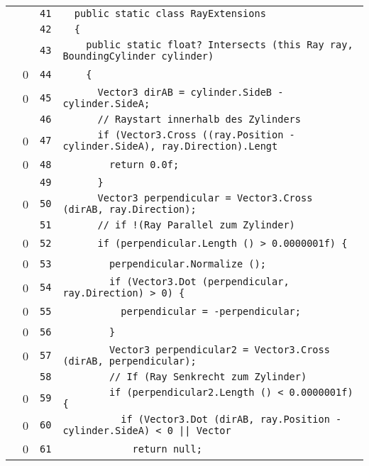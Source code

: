 \documentclass[a4paper,10pt]{article}
\begin{document}
\begin{longtable}[l]{lrrl}
\cellcolor{gray} &  & \verb~41~ & \verb~  public static class RayExtensions~\\
\cellcolor{gray} &  & \verb~42~ & \verb~  {~\\
\cellcolor{gray} &  & \verb~43~ & \verb~    public static float? Intersects (this Ray ray, BoundingCylinder cylinder)~\\
\cellcolor{red} & 0 & \verb~44~ & \verb~    {~\\
\cellcolor{red} & 0 & \verb~45~ & \verb~      Vector3 dirAB = cylinder.SideB - cylinder.SideA;~\\
\cellcolor{gray} &  & \verb~46~ & \verb~      // Raystart innerhalb des Zylinders~\\
\cellcolor{red} & 0 & \verb~47~ & \verb~      if (Vector3.Cross ((ray.Position - cylinder.SideA), ray.Direction).Lengt~\\
\cellcolor{red} & 0 & \verb~48~ & \verb~        return 0.0f;~\\
\cellcolor{gray} &  & \verb~49~ & \verb~      }~\\
\cellcolor{red} & 0 & \verb~50~ & \verb~      Vector3 perpendicular = Vector3.Cross (dirAB, ray.Direction);~\\
\cellcolor{gray} &  & \verb~51~ & \verb~      // if !(Ray Parallel zum Zylinder)~\\
\cellcolor{red} & 0 & \verb~52~ & \verb~      if (perpendicular.Length () > 0.0000001f) {~\\
\cellcolor{red} & 0 & \verb~53~ & \verb~        perpendicular.Normalize ();~\\
\cellcolor{red} & 0 & \verb~54~ & \verb~        if (Vector3.Dot (perpendicular, ray.Direction) > 0) {~\\
\cellcolor{red} & 0 & \verb~55~ & \verb~          perpendicular = -perpendicular;~\\
\cellcolor{red} & 0 & \verb~56~ & \verb~        }~\\
\cellcolor{red} & 0 & \verb~57~ & \verb~        Vector3 perpendicular2 = Vector3.Cross (dirAB, perpendicular);~\\
\cellcolor{gray} &  & \verb~58~ & \verb~        // If (Ray Senkrecht zum Zylinder)~\\
\cellcolor{red} & 0 & \verb~59~ & \verb~        if (perpendicular2.Length () < 0.0000001f) {~\\
\cellcolor{red} & 0 & \verb~60~ & \verb~          if (Vector3.Dot (dirAB, ray.Position - cylinder.SideA) < 0 || Vector~\\
\cellcolor{red} & 0 & \verb~61~ & \verb~            return null;~\\

\end{longtable}
\end{document}
